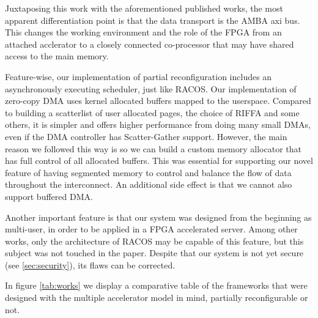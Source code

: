 Juxtaposing this work with the aforementioned published works, the most apparent differentiation point is that
the data transport is the AMBA \gls{axi} bus. This changes the working environment and the role of the FPGA
from an attached acclerator to a closely connected co-processor that may have shared access to the main memory.

Feature-wise, our implementation of partial reconfiguration includes an asynchronously executing scheduler, just like RACOS.
Our implementation of zero-copy DMA uses kernel allocated buffers mapped to the userspace. Compared to building a scatterlist
of user allocated pages, the choice of RIFFA and some others, 
it is simpler and offers higher performance from doing many small DMAs, even if the DMA controller has Scatter-Gather support.
However, the main reason we followed this way is so we can build a custom memory allocator that has full control of
all allocated buffers. This was essential for supporting our novel feature of having segmented memory to control and balance
the flow of data throughout the interconnect. An additional side effect is that we cannot also support buffered DMA.

Another important feature is that our system was designed from the beginning as multi-user, 
in order to be applied in a FPGA accelerated server. 
Among other works, only the architecture of RACOS may be capable of this feature, but this subject was not touched in the paper.
Despite that our system is not yet secure (see \ref{sec:security}), its flaws can be corrected.

In figure \ref{tab:works} we display a comparative table of the frameworks that 
were designed with the multiple accelerator model in mind, partially reconfigurable or not.


